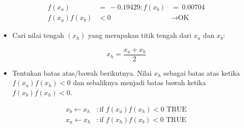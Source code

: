 \documentclass[11pt]{article}
\providecommand{\tightlist}{%
      \setlength{\itemsep}{0pt}\setlength{\parskip}{0pt}}
\begin{document}
\[\begin{aligned} f(x_a) &=\ -0.19429 ; f(x_b) &=\ 0.00704 \\
f(x_a)f(x_b) &< 0 &\rightarrow \text{OK} \end{aligned}\]

\begin{itemize}
\tightlist
\item
  Cari nilai tengah \((x_h)\) yang merupakan titik tengah dari \(x_a\)
  dan \(x_b\):
\end{itemize}

\[x_h = \frac{x_a + x_b}{2}\]

\begin{itemize}
\tightlist
\item
  Tentukan batas atas/bawah berikutnya. Nilai \(x_h\) sebagai batas atas
  ketika \(f(x_a)f(x_h)<0\) dan sebaliknya menjadi batas bawah ketika
  \(f(x_b)f(x_h)<0\).
\end{itemize}

\[\begin{aligned} x_b \leftarrow x_h &: \text{if } f(x_a)f(x_h)<0 \text{ TRUE} \\
x_a \leftarrow x_h &: \text{if } f(x_h)f(x_b)<0 \text{ TRUE}
\end{aligned}\]
\end{document}

